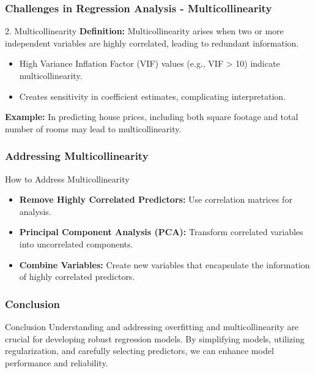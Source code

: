 \documentclass[aspectratio=169]{beamer}
\begin{document}
\begin{frame}[fragile]
    \frametitle{Challenges in Regression Analysis - Multicollinearity}
    \begin{block}{2. Multicollinearity}
        \textbf{Definition:} Multicollinearity arises when two or more independent variables are highly correlated, leading to redundant information.

        \begin{itemize}
            \item High Variance Inflation Factor (VIF) values (e.g., VIF > 10) indicate multicollinearity.
            \item Creates sensitivity in coefficient estimates, complicating interpretation.
        \end{itemize}

        \textbf{Example:}
        In predicting house prices, including both square footage and total number of rooms may lead to multicollinearity.
    \end{block}
\end{frame}

\begin{frame}[fragile]
    \frametitle{Addressing Multicollinearity}
    \begin{block}{How to Address Multicollinearity}
        \begin{itemize}
            \item \textbf{Remove Highly Correlated Predictors:} Use correlation matrices for analysis.
            \item \textbf{Principal Component Analysis (PCA):} Transform correlated variables into uncorrelated components.
            \item \textbf{Combine Variables:} Create new variables that encapsulate the information of highly correlated predictors.
        \end{itemize}
    \end{block}
\end{frame}

\begin{frame}[fragile]
    \frametitle{Conclusion}
    \begin{block}{Conclusion}
        Understanding and addressing overfitting and multicollinearity are crucial for developing robust regression models.
        By simplifying models, utilizing regularization, and carefully selecting predictors, we can enhance model performance and reliability.
    \end{block}
\end{frame}
\end{document}
